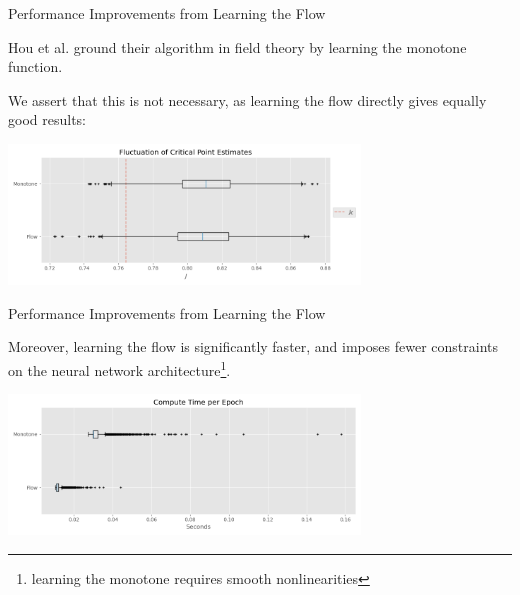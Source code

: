 \documentclass[aspectratio=169, 12pt]{beamer}
\begin{document}
\begin{frame}{Performance Improvements from Learning the Flow}

    Hou et al. ground their algorithm in field theory by learning the monotone function. 

    \vspace{1em}

    We assert that this is not necessary, as learning the flow directly gives equally good results:

    \begin{center}
        \includegraphics[width=0.7\textwidth]{images/a1-silu-flow-monotone-estimates.png}
    \end{center}

\end{frame}

\begin{frame}{Performance Improvements from Learning the Flow}

    Moreover, learning the flow is significantly faster, and imposes fewer constraints on the neural network architecture\footnote{learning the monotone requires smooth nonlinearities}. 

    \begin{center}
        \includegraphics[width=0.7\textwidth]{images/a1-silu-flow-monotone-times.png}
    \end{center}

\end{frame}
\end{document}
